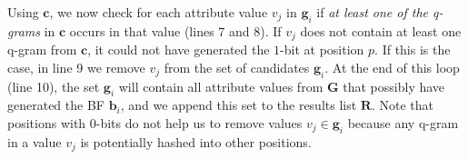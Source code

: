 \documentclass{llncs}
\begin{document}
Using $\mathbf{c}$, we now check for each attribute value $v_j$ in
$\mathbf{g}_i$ if \emph{at least one of the q-grams} in $\mathbf{c}$
occurs in that value (lines 7 and 8). If $v_j$ does not contain at
least one q-gram from $\mathbf{c}$, it could not have generated the
$1$-bit at position $p$. If this is the case, in line 9 we remove
$v_j$ from the set of candidates $\mathbf{g}_i$. At the end of this
loop (line 10), the set $\mathbf{g}_i$ will contain all attribute
values from $\mathbf{G}$ that possibly have generated the BF
$\mathbf{b}_i$, and we append this set to the results list
$\mathbf{R}$. Note that positions with $0$-bits do not help us to
remove values $v_j \in \mathbf{g}_i$ because any q-gram in a value
$v_j$ is potentially hashed into other positions.






\end{document}
